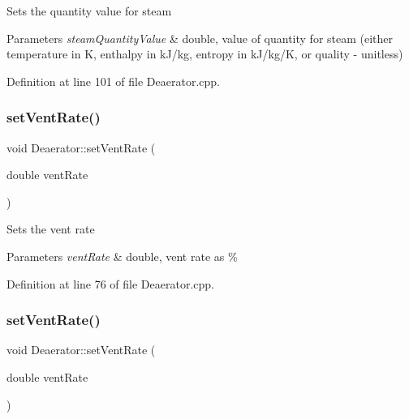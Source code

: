 Sets the quantity value for steam 
\begin{DoxyParams}{Parameters}
{\em steam\+Quantity\+Value} & double, value of quantity for steam (either temperature in K, enthalpy in k\+J/kg, entropy in k\+J/kg/K, or quality -\/ unitless) \\
\hline
\end{DoxyParams}


Definition at line 101 of file Deaerator.\+cpp.

\mbox{\label{class_deaerator_a11e71194f58763a57ec0f7d05a21782d}} 
\subsubsection{\texorpdfstring{set\+Vent\+Rate()}{setVentRate()}\hspace{0.1cm}{\footnotesize\ttfamily [1/3]}}
{\footnotesize\ttfamily void Deaerator\+::set\+Vent\+Rate (\begin{DoxyParamCaption}\item[{double}]{vent\+Rate }\end{DoxyParamCaption})}

Sets the vent rate 
\begin{DoxyParams}{Parameters}
{\em vent\+Rate} & double, vent rate as \% \\
\hline
\end{DoxyParams}


Definition at line 76 of file Deaerator.\+cpp.

\mbox{\label{class_deaerator_a11e71194f58763a57ec0f7d05a21782d}} 
\subsubsection{\texorpdfstring{set\+Vent\+Rate()}{setVentRate()}\hspace{0.1cm}{\footnotesize\ttfamily [2/3]}}
{\footnotesize\ttfamily void Deaerator\+::set\+Vent\+Rate (\begin{DoxyParamCaption}\item[{double}]{vent\+Rate }\end{DoxyParamCaption})}

